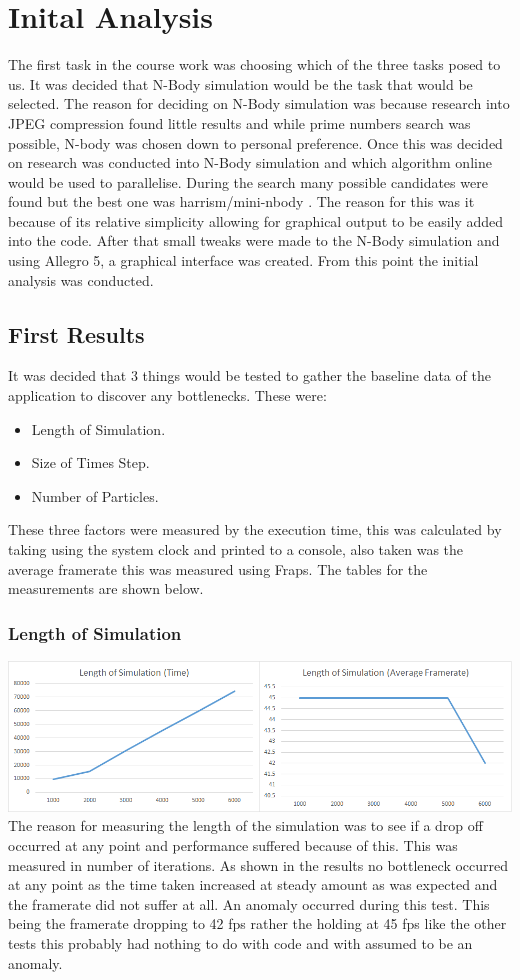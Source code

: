 \documentclass[12pt]{article}
\begin{document}
\section{Inital Analysis}
The first task in the course work was choosing which of the three tasks posed to us. It was decided that N-Body simulation would be the task that would be selected. The reason for deciding on N-Body simulation was because research into JPEG compression found little results and while prime numbers search was possible, N-body was chosen down to personal preference.
\newline 
Once this was decided on research was conducted into N-Body simulation and which algorithm online would be used to parallelise. During the search many possible candidates were found but the best one was harrism/mini-nbody . The reason for this was it because of its relative simplicity allowing for graphical output to be easily added into the code. After that small tweaks were made to the N-Body simulation and using Allegro 5, a graphical interface was created. From this point the initial analysis was conducted.
\subsection{First Results}
It was decided that 3 things would be tested to gather the baseline data of the application to discover any bottlenecks. These were:
\begin{itemize}
 \item Length of Simulation.
 \item Size of Times Step.
  \item Number of Particles. 
\end{itemize}
These three factors were measured by the execution time, this was calculated by taking using the system clock and printed to a console, also taken was the average framerate this was measured using Fraps. The tables for the measurements are shown below.
\subsubsection{Length of Simulation}
\includegraphics[scale=0.5]{pics/ialength.png}
\newline
The reason for measuring the length of the simulation was to see if a drop off occurred at any point and performance suffered because of this. This was measured in number of iterations. As shown in the results no bottleneck occurred at any point as the time taken increased at steady amount as was expected and the framerate did not suffer at all. An anomaly occurred during this test. This being the framerate dropping to 42 fps rather the holding at 45 fps like the other tests this probably had nothing to do with code and with assumed to be an anomaly.
\end{document}
